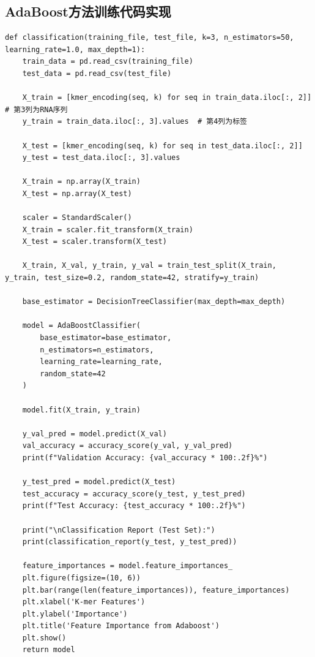 \documentclass[a4paper,11pt,AutoFakeBold]{ctexart}
\begin{document}
\subsection{AdaBoost方法训练代码实现}
\begin{lstlisting}
def classification(training_file, test_file, k=3, n_estimators=50, learning_rate=1.0, max_depth=1):
    train_data = pd.read_csv(training_file)
    test_data = pd.read_csv(test_file)

    X_train = [kmer_encoding(seq, k) for seq in train_data.iloc[:, 2]]  # 第3列为RNA序列
    y_train = train_data.iloc[:, 3].values  # 第4列为标签
    
    X_test = [kmer_encoding(seq, k) for seq in test_data.iloc[:, 2]]
    y_test = test_data.iloc[:, 3].values

    X_train = np.array(X_train)
    X_test = np.array(X_test)

    scaler = StandardScaler()
    X_train = scaler.fit_transform(X_train)
    X_test = scaler.transform(X_test)

    X_train, X_val, y_train, y_val = train_test_split(X_train, y_train, test_size=0.2, random_state=42, stratify=y_train)

    base_estimator = DecisionTreeClassifier(max_depth=max_depth)

    model = AdaBoostClassifier(
        base_estimator=base_estimator,
        n_estimators=n_estimators,
        learning_rate=learning_rate,
        random_state=42
    )

    model.fit(X_train, y_train)

    y_val_pred = model.predict(X_val)
    val_accuracy = accuracy_score(y_val, y_val_pred)
    print(f"Validation Accuracy: {val_accuracy * 100:.2f}%")

    y_test_pred = model.predict(X_test)
    test_accuracy = accuracy_score(y_test, y_test_pred)
    print(f"Test Accuracy: {test_accuracy * 100:.2f}%")

    print("\nClassification Report (Test Set):")
    print(classification_report(y_test, y_test_pred))

    feature_importances = model.feature_importances_
    plt.figure(figsize=(10, 6))
    plt.bar(range(len(feature_importances)), feature_importances)
    plt.xlabel('K-mer Features')
    plt.ylabel('Importance')
    plt.title('Feature Importance from Adaboost')
    plt.show()
    return model
\end{lstlisting}
\end{document}
